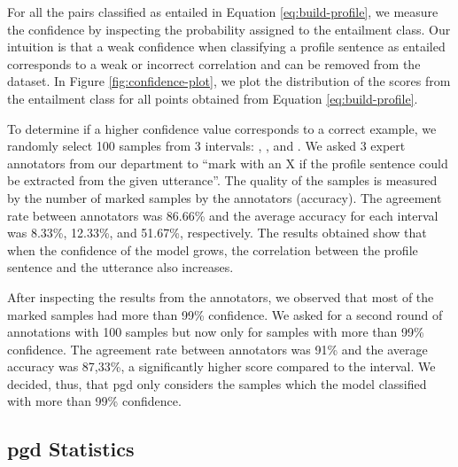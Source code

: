 \documentclass[11pt]{article}
\begin{document}
For all the pairs classified as entailed in Equation \ref{eq:build-profile}, we measure the confidence by inspecting the  probability assigned to the entailment class.
Our intuition is that a weak confidence when classifying a profile sentence as entailed corresponds to a weak or incorrect correlation and can be removed from the dataset.
In Figure \ref{fig:confidence-plot}, we plot the distribution of the scores from the entailment class for all points obtained from Equation \ref{eq:build-profile}.

To determine if a higher confidence value corresponds to a correct example, we randomly select 100 samples from 3 intervals: , , and .
We asked 3 expert annotators from our department to ``mark with an X if the profile sentence could be extracted from the given utterance''.
The quality of the samples is measured by the number of marked samples by the annotators (accuracy).
The agreement rate between annotators was 86.66\% and the average accuracy for each interval was 8.33\%, 12.33\%, and 51.67\%, respectively.
The results obtained show that when the confidence of the model grows, the correlation between the profile sentence and the utterance also increases.

After inspecting the results from the annotators, we observed that most of the marked samples had more than 99\% confidence.
We asked for a second round of annotations with 100 samples but now only for samples with more than 99\% confidence.
The agreement rate between annotators was 91\% and the average accuracy was 87,33\%, a significantly higher score compared to the  interval. We decided, thus, that \gls*{pgd} only considers the samples which the model classified with more than 99\% confidence.






\subsection{\gls*{pgd} Statistics}
\end{document}
